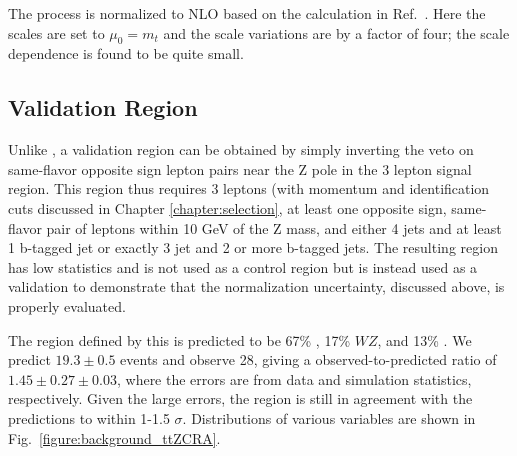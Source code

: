The \tZ process is normalized to NLO based on the calculation in Ref.~\cite{Campbell:2013yla}.  Here the scales are set to $\mu_0 = m_t$ and the scale variations are by a factor of four; the scale dependence is found to be quite small.


\subsection{\ttZ Validation Region}

Unlike \ttW, a \ttZ validation region can be obtained by simply inverting the veto on same-flavor opposite sign lepton pairs near the Z pole in the 3 lepton signal region. This region thus requires 3 leptons (with momentum and identification cuts discussed in Chapter \ref{chapter:selection}, at least one opposite sign, same-flavor pair of leptons within 10 GeV of the Z mass, and either 4 jets and at least 1 b-tagged jet or exactly 3 jet and 2 or more b-tagged jets. The resulting region has low statistics and is not used as a control region but is instead used as a validation to demonstrate that the normalization uncertainty, discussed above, is properly evaluated. 

The region defined by this is predicted to be 67\% \ttZ, 17\% $WZ$, and 13\% \tZ.  We predict $19.3 \pm 0.5$ events and observe 28, giving a observed-to-predicted ratio of $1.45 \pm 0.27 \pm 0.03$, where the errors are from data and simulation statistics, respectively. Given the large errors, the region is still in agreement with the predictions to within 1-1.5 $\sigma$.  Distributions of various variables are shown in Fig.~\ref{figure:background_ttZCRA}.  

